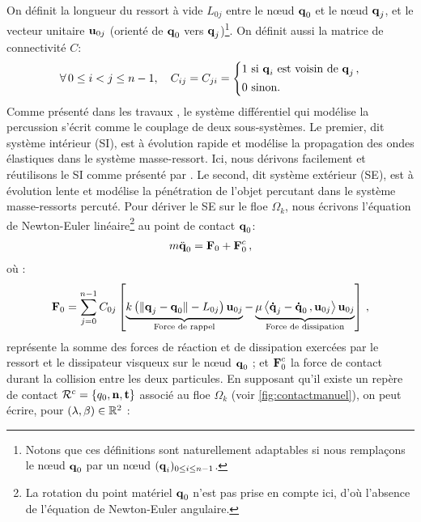 \noindent On définit la longueur du ressort à vide $L_{0j}$ entre le n\oe{}ud $\bm{\mathrm{q}}_0$ et le n\oe{}ud $\bm{\mathrm{q}}_j$, et le vecteur unitaire $\bm{\mathrm{u}}_{0j}$ (orienté de $\bm{\mathrm{q}}_0$ vers $\bm{\mathrm{q}}_j$)\footnote{Notons que ces définitions sont naturellement adaptables si nous remplaçons le n\oe{}ud $\bm{\mathrm{q}}_0$ par un n\oe{}ud $(\bm{\mathrm{q}}_i)_{0 \leq i \leq n-1}$.}. On définit aussi la matrice de connectivité $C$:
\begin{align*}
    \forall \, 0 \leq i < j \leq n-1, \quad C_{ij} = C_{ji} = \begin{dcases}
    1 \text{ si } \bm{\mathrm{q}}_i \text{ est voisin de } \bm{\mathrm{q}}_j \,, \\
    0 \text{ sinon}.
\end{dcases}
\end{align*}
\noindent Comme présenté dans les travaux \parencite[p.186]{balasoiu2020halthesis}, le système différentiel qui modélise la percussion s’écrit comme le couplage de deux sous-systèmes. Le premier, dit système intérieur (SI), est à évolution rapide et modélise la propagation des ondes élastiques dans le système masse-ressort. Ici, nous dérivons facilement et réutilisons le SI comme présenté par \citeauthor{balasoiu2020halthesis}. Le second, dit système extérieur (SE), est à évolution lente et modélise la pénétration de l’objet percutant dans le système masse-ressorts percuté. Pour dériver le SE sur le floe $\Omega_k$, nous écrivons l'équation de Newton-Euler linéaire\footnote{La rotation du point matériel $\bm{\mathrm{q}}_0$ n'est pas prise en compte ici, d'où l'absence de l'équation de Newton-Euler angulaire.} au point de contact $\bm{\mathrm{q}}_0$:
\begin{align}  \label{eq:SE}
m \ddot{\bm{\mathrm{q}}}_0 = \bm{\mathrm{F}}_0 + \bm{\mathrm{F}}^c_0 \,,
\end{align}
où :
\begin{align}  \label{eq:F0}
    \bm{\mathrm{F}}_0 = \sum_{j=0}^{n-1}C_{0j} \left[  \underbrace{k \left( \Vert \bm{\mathrm{q}}_j - \bm{\mathrm{q}}_0 \Vert - L_{0j} \right) \bm{\mathrm{u}}_{0j}}_{\text{Force de rappel}} - \underbrace{\mu \left\langle \bm{\mathrm{\dot{q}}}_j - \bm{\mathrm{\dot{q}}}_0\,, \bm{\mathrm{u}}_{0j}  \right\rangle  \bm{\mathrm{u}}_{0j}}_{\text{Force de dissipation}}  \right] \,,
\end{align}
représente la somme des forces de réaction et de dissipation exercées par le ressort et le dissipateur visqueux sur le n\oe{}ud $\bm{\mathrm{q}}_0$ ; et $\bm{\mathrm{F}}^c_0$ la force de contact durant la collision entre les deux particules. En supposant qu'il existe un repère de contact $\mathcal{R}^c = \{ q_0, \bm{\mathrm{n}}, \bm{\mathrm{t}} \}$ associé au floe $\Omega_k$ (voir \cref{fig:contactmanuel}), on peut écrire, pour $(\lambda, \beta) \in \mathbb{R}^2$ :
